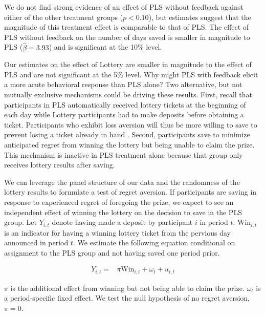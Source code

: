 \documentclass[11pt]{article}
\begin{document}
		We do not find strong evidence of an effect of PLS without feedback against either of the other treatment groups ($p < 0.10$), but estimates suggest that the magnitude of this treatment effect is comparable to that of PLS. The effect of PLS without feedback on the number of days saved is smaller in magnitude to PLS ($\hat \beta = 3.93$) and is significant at the 10\% level.


		Our estimates on the effect of Lottery are smaller in magnitude to the effect of PLS and are not significant at the 5\% level. Why might PLS with feedback elicit a more acute behavioral response than PLS alone? Two alternative, but not mutually exclusive mechanisms could be driving these results. First, recall that participants in PLS automatically received lottery tickets at the beginning of each day while Lottery participants had to make deposits before obtaining a ticket. Participants who exhibit loss aversion will thus be more willing to save to prevent losing a ticket already in hand \parencite{kahneman_advances_1992}. Second, participants save to minimize anticipated regret from winning the lottery but being unable to claim the prize. This mechanism is inactive in PLS treatment alone because that group only receives lottery results after saving.


		We can leverage the panel structure of our data and the randomness of the lottery results to formulate a test of regret aversion. If participants are saving in response to experienced regret of foregoing the prize, we expect to see an independent effect of winning the lottery on the decision to save in the PLS group. Let $Y_{i,t}$ denote having made a deposit by participant $i$ in period $t$. $\text{Win}_{i,t}$ is an indicator for having a winning lottery ticket from the pervious day announced in period $t$. We estimate the following equation conditional on assignment to the PLS group and not having saved one period prior.

		\begin{equation} \begin{split}
		Y_{i,t} = & \pi \text{Win}_{i,t} + \omega_{t} + u_{i,t}
		\end{split} \label{eq:regret} \end{equation}

		$\pi$ is the additional effect from winning but not being able to claim the prize. $\omega_{t}$ is a period-specific fixed effect. We test the null hypothesis of no regret aversion, $\pi = 0$.
\end{document}
